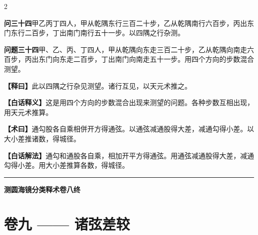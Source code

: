 \documentclass[11pt,a4paper]{article}
\newcommand{\WenQuestion}[1]{\textbf{\textcolor{classicalcolor}{#1}}}
\newcommand{\BaiQuestion}[1]{\textbf{\textcolor{moderncolor}{#1}}}
\newcommand{\WenExplain}{\textcolor{classicalcolor}{\textbf{【释曰】}}}
\newcommand{\BaiExplain}{\textcolor{moderncolor}{\textbf{【白话释义】}}}
\newcommand{\WenMethod}{\textcolor{classicalcolor}{\textbf{【术曰】}}}
\newcommand{\BaiMethod}{\textcolor{moderncolor}{\textbf{【白话解法】}}}
\begin{document}
\begin{paracol}{2}
\vspace{0.8em}

\switchcolumn*
\begin{tcolorbox}[colback=red!3,colframe=red!30!black,boxrule=0.3pt]
\WenQuestion{问三十四}\quad 甲乙丙丁四人，甲从乾隅东行三百二十步，乙从乾隅南行六百步，丙出东门东行二百步，丁出南门南行五十一步。以四隅之行杂测。
\end{tcolorbox}
\switchcolumn
\begin{tcolorbox}[colback=blue!3,colframe=blue!30!black,boxrule=0.3pt]
\BaiQuestion{问题三十四}\quad 甲、乙、丙、丁四人，甲从乾隅向东走三百二十步，乙从乾隅向南走六百步，丙出东门向东走二百步，丁出南门向南走五十一步。用四个方向的步数混合测望。
\end{tcolorbox}

\switchcolumn*
\begin{tcolorbox}[colback=red!5,colframe=red!30!black,boxrule=0.3pt]
\WenExplain\quad 此以四隅之行杂见测望。诸行互见，以天元术推之。
\end{tcolorbox}
\switchcolumn
\begin{tcolorbox}[colback=blue!5,colframe=blue!30!black,boxrule=0.3pt]
\BaiExplain\quad 这是用四个方向的步数混合出现来测望的问题。各种步数互相出现，用天元术推算。
\end{tcolorbox}

\switchcolumn*
\begin{tcolorbox}[colback=red!5,colframe=red!40!black,boxrule=0.3pt]
\WenMethod\quad 通勾股各自乘相併开方得通弦。以通弦减通股得大差，减通勾得小差。以大小差推诸数，得城径。
\end{tcolorbox}
\switchcolumn
\begin{tcolorbox}[colback=blue!5,colframe=blue!40!black,boxrule=0.3pt]
\BaiMethod\quad 通勾和通股各自乘，相加开平方得通弦。用通弦减通股得大差，减通勾得小差。用大小差推算各数，得城径。
\end{tcolorbox}

\end{paracol}

\vspace{1em}
\begin{center}
\rule{0.5\textwidth}{0.4pt}

\textbf{\textcolor{volumecolor}{测圆海镜分类释术卷八终}}
\end{center}



\newpage
\section*{\textcolor{volumecolor}{卷九} —— 诸弦差较}
\end{document}
